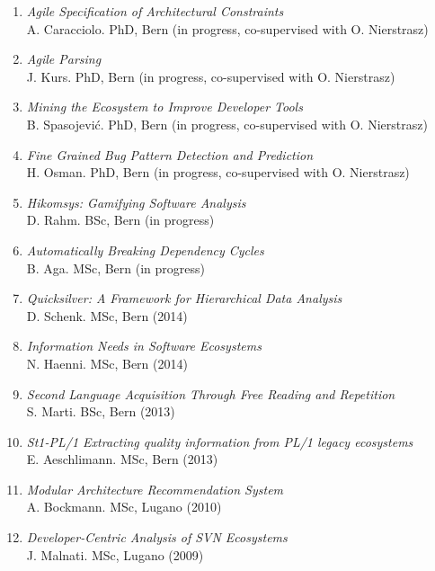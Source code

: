 
\newcommand{\super}[5]{\item \emph{#2}\\ #1. #3, #4 #5}
\newcommand{\inprogr}{{\footnotesize(in progress)}}
\newcommand{\inprogrcosup}{{\footnotesize(in progress, co-supervised with O. Nierstrasz)}}

\newcommand{\yr}[1]{(#1)}


\begin{enumerate}

\super 
	{A. Caracciolo}
	{Agile Specification of Architectural Constraints}
	{PhD}
	{Bern}
	{\inprogrcosup}

\super 
	{J. Kurs}
	{Agile Parsing}
	{PhD}
	{Bern}
	{\inprogrcosup}	

\super 
	{B. Spasojevi\'{c}}
	{Mining the Ecosystem to Improve Developer Tools}
	{PhD}
	{Bern}
	{\inprogrcosup}

\super 
	{H. Osman}
	{Fine Grained Bug Pattern Detection and Prediction}
	{PhD}
	{Bern}
	{\inprogrcosup}	



\super 
	{D. Rahm}
	{Hikomsys: Gamifying Software Analysis}
	{BSc}
	{Bern}
	{\inprogr}

\super 
	{B. Aga}
	{Automatically Breaking Dependency Cycles}
	{MSc}
	{Bern}
	{\inprogr}

\super 
	{D. Schenk}
	{Quicksilver: A Framework for Hierarchical Data Analysis}
	{MSc}
	{Bern}
	{\yr{2014}}

\super 
	{N. Haenni}
	{Information Needs in Software Ecosystems}
	{MSc}
	{Bern}
	{\yr{2014}}

\super 
	{S. Marti}
	{Second Language Acquisition Through Free Reading and Repetition}
	{BSc}
	{Bern}
	{\yr{2013}}

\super 
	{E. Aeschlimann}
	{St1-PL/1
Extracting quality information from PL/1 legacy ecosystems}
	{MSc}
	{Bern}
	{\yr{2013}}


\super 
	{A. Bockmann}
	{Modular Architecture Recommendation System}
	{MSc}
	{Lugano}
	{\yr{2010}}

\super 
	{J. Malnati}
	{Developer-Centric Analysis of SVN Ecosystems}
	{MSc}
	{Lugano}
	{\yr{2009}}



\end{enumerate}